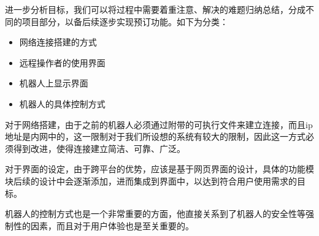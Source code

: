 
进一步分析目标，我们可以将过程中需要着重注意、解决的难题归纳总结，分成不同的项目部分，以备后续逐步实现预订功能。如下为分类：

\begin{itemize} \tightlist
\item 网络连接搭建的方式

\item 远程操作者的使用界面

\item 机器人上显示界面

\item 机器人的具体控制方式

\end{itemize}




对于网络搭建，由于之前的机器人必须通过附带的可执行文件来建立连接，而且ip地址是内网中的，这一限制对于我们所设想的系统有较大的限制，因此这一方式必须得到改进，使得连接建立简洁、可靠、广泛。

对于界面的设定，由于跨平台的优势，应该是基于网页界面的设计，具体的功能模块后续的设计中会逐渐添加，进而集成到界面中，以达到符合用户使用需求的目标。

机器人的控制方式也是一个非常重要的方面，他直接关系到了机器人的安全性等强制性的因素，而且对于用户体验也是至关重要的。


